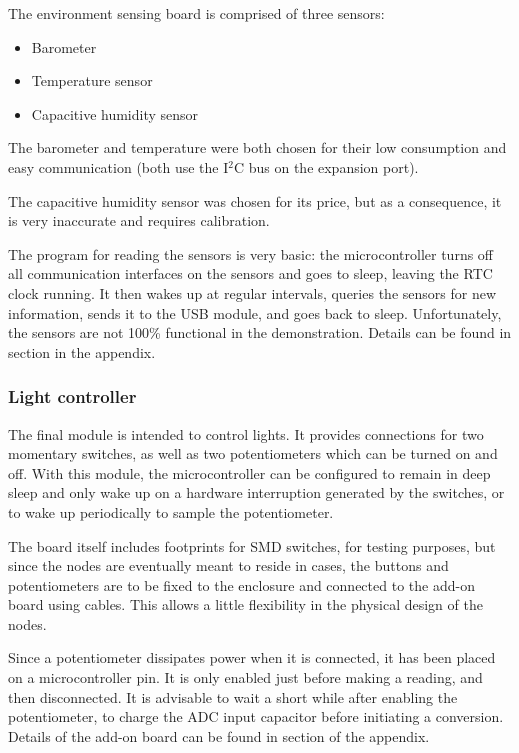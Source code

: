 The environment sensing board is comprised of three sensors:

\begin{itemize}
  \item Barometer
  \item Temperature sensor
  \item Capacitive humidity sensor
\end{itemize}


The barometer and temperature were both chosen for their low consumption and
easy communication (both use the I$^{2}$C bus on the expansion port).

The capacitive humidity sensor was chosen for its price, but as a consequence,
it is very inaccurate and requires calibration.

The program for reading the sensors is very basic: the microcontroller turns off
all communication interfaces on the sensors and goes to sleep, leaving the RTC
clock running. It then wakes up at regular intervals, queries the sensors for
new information, sends it to the USB module, and goes back to sleep.
Unfortunately, the sensors are not 100\% functional in the demonstration.
Details can be found in section  in the appendix.

\subsubsection{Light controller}

The final module is intended to control lights. It provides connections for two
momentary switches, as well as two potentiometers which can be turned on and
off. With this module, the microcontroller can be configured to remain in deep
sleep and only wake up on a hardware interruption generated by the switches, or
to wake up periodically to sample the potentiometer.

The board itself includes footprints for SMD switches, for testing purposes, but
since the nodes are eventually meant to reside in cases, the buttons and
potentiometers are to be fixed to the enclosure and connected to the add-on
board using cables. This allows a little flexibility in the physical design of
the nodes.

Since a potentiometer dissipates power when it is connected, it has been placed
on a microcontroller pin. It is only enabled just before making a reading, and
then disconnected. It is advisable to wait a short while after enabling the
potentiometer, to charge the ADC input capacitor before initiating a conversion.
Details of the add-on board can be found in section  of
the appendix.

